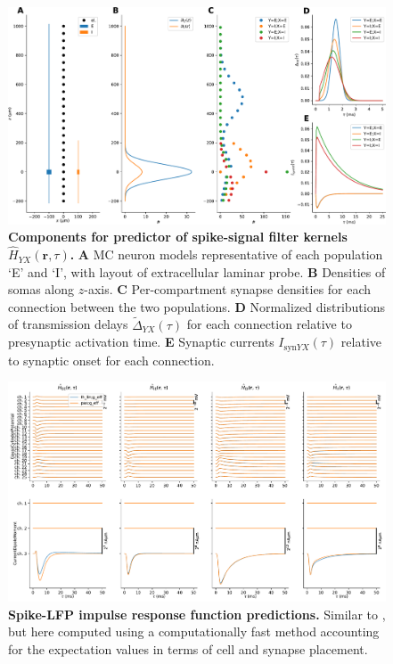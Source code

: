 \begin{figure}[!ht]
\begin{center}
\includegraphics[width=\textwidth]{Figures/Ch-LFPy/Ch-LFPy-ratepredictor.pdf}
\end{center}
\caption{\textbf{Components for predictor of spike-signal filter kernels $\hat{H}_{YX}(\mathbf{r}, \tau)$.}
{\bf A} MC neuron models representative of each population `E' and `I',
with layout of extracellular laminar probe.
{\bf B} Densities of somas along $z$-axis.
{\bf C} Per-compartment synapse densities for each connection between the two populations.
{\bf D} Normalized distributions of transmission delays $\widetilde{\Delta}_{YX} (\tau)$ for each connection relative to presynaptic activation time.
{\bf E} Synaptic currents $I_{\text{syn}YX}(\tau)$ relative to synaptic onset for each connection.
}
\label{fig:LFPy_kernel_predictor}
\end{figure}




\begin{figure}[!ht]
\begin{center}
\includegraphics[width=\textwidth]{Figures/Ch-LFPy/Ch-LFPy-kernel_approx.pdf}
\end{center}
\caption{\textbf{Spike-LFP impulse response function predictions.}
Similar to ,
but here computed using a computationally fast method accounting for the expectation values in terms of cell and synapse placement.
}
\label{fig:LFPy_kernel_predictions}
\end{figure}


